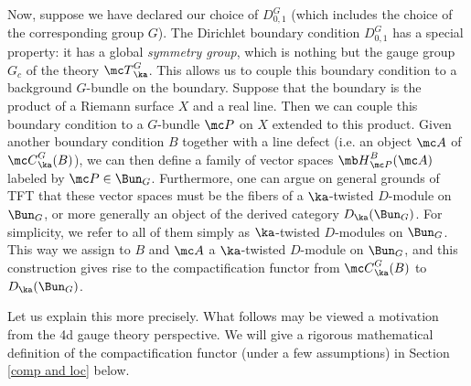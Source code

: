 \documentclass[11pt,reqno]{amsart}
\theoremstyle{plain}
\numberwithin{equation}{section}
\theoremstyle{definition}
\begin{document}
Now, suppose we have declared our choice of $D^G_{0,1}$ (which
includes the choice of the corresponding group $G$). The Dirichlet
boundary condition $D^G_{0,1}$ has a special property: it has a global
{\em symmetry group}, which is nothing but the gauge group $G_c$ of
the theory ${\mc T}^G_\ka$. This allows us to couple this boundary
condition to a background $G$-bundle on the boundary. Suppose that the
boundary is the product of a Riemann surface $X$ and a real line. Then
we can couple this boundary condition to a $G$-bundle ${\mc P}$ on $X$
extended to this product. Given another boundary condition $B$
together with a line defect (i.e. an object ${\mc A}$ of ${\mc
  C}^G_\ka(B)$), we can then define a family of vector spaces ${\mb
  H}^B_{\mc P}({\mc A})$ labeled by ${\mc P} \in \Bun_G$. Furthermore,
one can argue on general grounds of TFT that these vector spaces must
be the fibers of a $\ka$-twisted $D$-module on $\Bun_G$, or more
generally an object of the derived category $D_\ka(\Bun_G)$. For
simplicity, we refer to all of them simply as $\ka$-twisted
$D$-modules on $\Bun_G$. This way we assign to $B$ and ${\mc A}$ a
$\ka$-twisted $D$-module on $\Bun_G$, and this construction gives rise
to the compactification functor from ${\mc C}^G_\ka(B)$ to
$D_\ka(\Bun_G)$.

Let us explain this more precisely. What follows may be viewed a
motivation from the 4d gauge theory perspective. We will give a
rigorous mathematical definition of the compactification functor
(under a few assumptions) in Section \ref{comp and loc} below.

\bigskip
\end{document}
